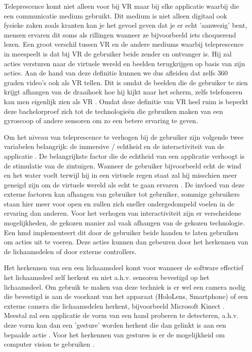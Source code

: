 Teleprescence komt niet alleen voor bij VR maar bij elke applicatie waarbij die een communicatie medium gebruikt. Dit medium is niet alleen digitaal ook fysieke zaken zoals kranten kan je het gevoel geven dat je er echt 'aanwezig' bent, mensen ervaren dit soms als rillingen wanneer ze bijvoorbeeld iets choquerend lezen. 
Een groot verschil tussen VR en de andere mediums waarbij teleprescence in meespeelt is dat bij VR de gebruiker beide zender en ontvanger is. Hij zal acties versturen naar de virtuele wereld en beelden terugkrijgen op basis van zijn acties.
Aan de hand van deze definitie kunnen we dus afleiden dat zelfs 360 graden video's ook als VR tellen. Dit is omdat de beelden die de gebruiker te zien krijgt afhangen van de draaihoek hoe hij kijkt naar het scherm, zelfs telefoneren kan men eigenlijk zien als VR \autocite{Steuer1992}.
Omdat deze definitie van VR heel ruim is beperkt deze bachelorproef zich tot de technologieën die gebruiken maken van een gyroscoop of andere sensoren om zo een betere ervaring te geven.

Om het niveau van teleprescence te verhogen bij de gebruiker zijn volgende twee variabelen belangrijk: de immersive / echtheid en de interactiviteit van de applicatie \autocite{Steuer1992}.
De belangrijkste factor die de echtheid van een applicatie verhoogt is de stimulatie van de zintuigen. Wanneer de gebruiker bijvoorbeeld echt de wind en het water voelt terwijl hij in een virtuele regen staat zal hij misschien meer geneigd zijn om de virtuele wereld als echt te gaan ervaren \autocite{Steuer1992}. De invloed van deze externe factoren kan afhangen van gebruiker tot gebruiker, sommige gebruikers staan hier meer voor open en zullen zich sneller ondergedompeld voelen in de ervaring dan anderen.
Voor het verhogen van interactiviteit zijn er verscheidene mogelijkheden, de gekozen manier zal vaak afhangen van de gekozen technologie. Een \acrfull{hmd} implementeert dit door de gebruiker beide handen te laten gebruiken om acties uit te voeren. Deze acties kunnen dan gebeuren door het herkennen van de lichaamsdelen of door externe controllers.

Het herkennen van een een lichaamsdeel komt voor wanneer de software effectief het lichaamsdeel zelf herkent en niet a.h.v. sensoren bevestigd op het lichaamsdeel. Om gebruik te maken van deze techniek is er wel een camera nodig die bevestigd is aan de voorkant van het apparaat (HoloLens, Smartphone) of een externe camera die lichaamsdelen herkent, bijvoorbeeld Microsoft Kinect \autocite{Ren2013}.
Meestal zal een applicatie de vorm van een hand proberen te detecteren, a.h.v. deze vorm kan dan een 'gesture' worden herkent die dan gelinkt is aan een bepaalde actie \autocite{Piumsomboon2013}. 
Voor het herkennen van gestures is er de mogelijkheid om computer vision te gebruiken \autocite{Ji2013}.



